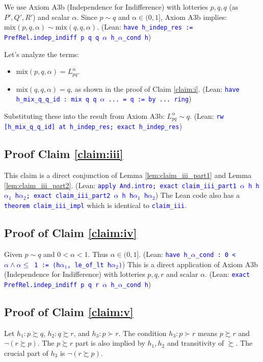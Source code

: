 \documentclass{article}
\theoremstyle{definition}
\newcommand{\tactic}[1]{\textcolor{blue}{\texttt{#1}}}
\newcommand{\pref}{\succsim} %
\newcommand{\strictpref}{\succ} %
\newcommand{\indiff}{\sim} %
\newcommand{\mix}{\mathrm{mix}} %
\begin{document}
We use Axiom A3b (Independence for Indifference) with lotteries $p, q, q$ (as $P', Q', R'$) and scalar $\alpha$.
Since $p \indiff q$ and $\alpha \in (0,1]$, Axiom A3b implies:
$\mix(p, q, \alpha) \indiff \mix(q, q, \alpha)$.
(Lean: \tactic{have h\_indep\_res := PrefRel.indep\_indiff p q q $\alpha$ h\_$\alpha$\_cond h})

Let's analyze the terms:
\begin{itemize}
    \item $\mix(p, q, \alpha) = L_{pq}^\alpha$.
    \item $\mix(q, q, \alpha) = q$, as shown in the proof of Claim \ref{claim:i}.
    (Lean: \tactic{have h\_mix\_q\_q\_id : mix q q $\alpha$ ... = q := by ... ring})
\end{itemize}
Substituting these into the result from Axiom A3b:
$L_{pq}^\alpha \indiff q$.
(Lean: \tactic{rw [h\_mix\_q\_q\_id] at h\_indep\_res; exact h\_indep\_res})

\subsection{Proof Claim \ref{claim:iii}}\label{proof:claim:iii}
This claim is a direct conjunction of Lemma \ref{lem:claim_iii_part1} and Lemma \ref{lem:claim_iii_part2}.
(Lean: \tactic{apply And.intro; exact claim\_iii\_part1 $\alpha$ h h$\alpha_1$ h$\alpha_2$; exact claim\_iii\_part2 $\alpha$ h h$\alpha_1$ h$\alpha_2$})
The Lean code also has a \tactic{theorem claim\_iii\_impl} which is identical to \tactic{claim\_iii}.

\subsection{Proof of Claim \ref{claim:iv}}\label{proof:claim:iv}
Given $p \indiff q$ and $0 < \alpha < 1$. Thus $\alpha \in (0,1]$.
(Lean: \tactic{have h\_$\alpha$\_cond : 0 < $\alpha\wedge\alpha\leq$ 1 := ⟨h$\alpha_1$, le\_of\_lt h$\alpha_2$⟩})
This is a direct application of Axiom A3b (Independence for Indifference) with lotteries $p,q,r$ and scalar $\alpha$.
(Lean: \tactic{exact PrefRel.indep\_indiff p q r $\alpha$ h\_$\alpha$\_cond h})

\subsection{Proof of Claim \ref{claim:v}}\label{proof:claim:v}
Let $h_1: p \pref q$, $h_2: q \pref r$, and $h_3: p \strictpref r$.
The condition $h_3: p \strictpref r$ means $p \pref r$ and $\lnot(r \pref p)$. The $p \pref r$ part is also implied by $h_1, h_2$ and transitivity of $\pref$. The crucial part of $h_3$ is $\lnot(r \pref p)$.
\end{document}
